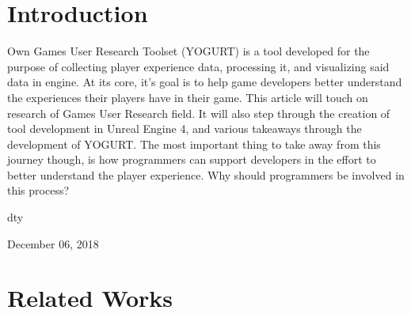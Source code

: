 \documentclass[journal]{IEEEtran}
\begin{document}
\section{Introduction}
% 
% 
% 
% 
 Own Games User Research Toolset (YOGURT) is a tool developed for the purpose of collecting player experience data, processing it, and visualizing said data in engine. At its core, it's goal is to help game developers better understand the experiences their players have in their game. This article will touch on research of Games User Research field. It will also step through the creation of tool development in Unreal Engine 4, and various takeaways through the development of YOGURT. The most important thing to take away from this journey though, is how programmers can support developers in the effort to better understand the player experience. Why should programmers be involved in this process?

\hfill dty
 
\hfill December 06, 2018

\section{Related Works}
\end{document}
